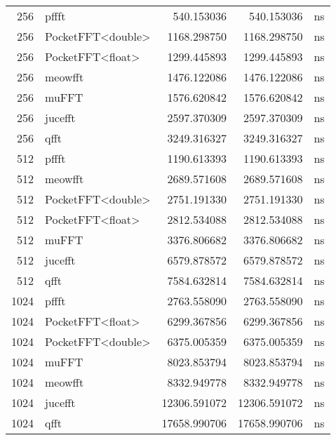 \begin{tabular}{rlrrl}
256 & pffft & 540.153036 & 540.153036 & ns \\
256 & PocketFFT<double> & 1168.298750 & 1168.298750 & ns \\
256 & PocketFFT<float> & 1299.445893 & 1299.445893 & ns \\
256 & meowfft & 1476.122086 & 1476.122086 & ns \\
256 & muFFT & 1576.620842 & 1576.620842 & ns \\
256 & jucefft & 2597.370309 & 2597.370309 & ns \\
256 & qfft & 3249.316327 & 3249.316327 & ns \\
512 & pffft & 1190.613393 & 1190.613393 & ns \\
512 & meowfft & 2689.571608 & 2689.571608 & ns \\
512 & PocketFFT<double> & 2751.191330 & 2751.191330 & ns \\
512 & PocketFFT<float> & 2812.534088 & 2812.534088 & ns \\
512 & muFFT & 3376.806682 & 3376.806682 & ns \\
512 & jucefft & 6579.878572 & 6579.878572 & ns \\
512 & qfft & 7584.632814 & 7584.632814 & ns \\
1024 & pffft & 2763.558090 & 2763.558090 & ns \\
1024 & PocketFFT<float> & 6299.367856 & 6299.367856 & ns \\
1024 & PocketFFT<double> & 6375.005359 & 6375.005359 & ns \\
1024 & muFFT & 8023.853794 & 8023.853794 & ns \\
1024 & meowfft & 8332.949778 & 8332.949778 & ns \\
1024 & jucefft & 12306.591072 & 12306.591072 & ns \\
1024 & qfft & 17658.990706 & 17658.990706 & ns \\
\bottomrule
\end{tabular}
